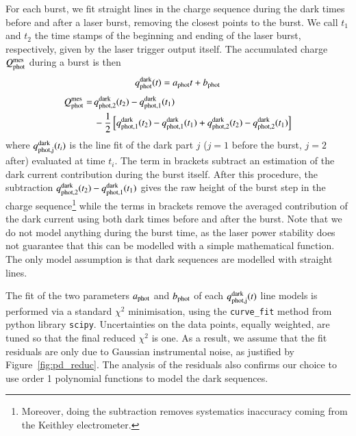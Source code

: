 For each burst, we fit straight lines in the charge sequence during the dark times before and after a laser burst, removing the closest points to the burst. We call $t_1$ and $t_2$ the time stamps of the beginning and ending of the laser burst, respectively, given by the laser trigger output itself. 
The accumulated charge $Q_{\mathrm{phot}}^{\mathrm{mes}}$ during a burst is then
\begin{equation}
q_{\rm phot}^{\rm dark}(t) = a_{\rm phot} t + b_{\rm phot}
\end{equation}
\begin{align}
Q_{\mathrm{phot}}^{\mathrm{mes}} = \, &q_{\rm phot,2}^{\rm dark}(t_2) - q_{\rm phot,1}^{\rm dark}(t_1)\\ & - \frac{1}{2} \left[ q_{\rm phot,1}^{\rm dark}(t_2) -  q_{\rm phot,1}^{\rm dark}(t_1) + q_{\rm phot,2}^{\rm dark}(t_2) - q_{\rm phot,2}^{\rm dark}(t_1)  \right]   \notag 
\end{align}
where $q_{\rm phot,j}^{\rm dark}(t_i)$ is the line fit of the dark part $j$ ($j=1$ before the burst, $j=2$ after) evaluated at time $t_i$. The term in brackets subtract an estimation of the dark current contribution during the burst itself. After this procedure, the subtraction $q_{\rm phot,2}^{\rm dark}(t_2) - q_{\rm phot,1}^{\rm dark}(t_1)$ gives the raw height of the burst step in the charge sequence\footnote{Moreover, doing the subtraction removes systematics inaccuracy coming from the Keithley electrometer.} while the terms in brackets remove the averaged contribution of the dark current using both dark times before and after the burst. Note that we do not model anything during the burst time, as the laser power stability does not guarantee that this can be modelled with a simple mathematical function. The only model assumption is that dark sequences are modelled with straight lines.

The fit of the two parameters $a_{\rm phot}$ and $b_{\rm phot}$ of each $q_{\rm phot,j}^{\rm dark}(t)$ line models is performed via a standard $\chi^2$ minimisation, using the \texttt{curve\_fit} method from python library \texttt{scipy}. Uncertainties on the data points, equally weighted, are tuned so that the final reduced $\chi^2$ is one. As a result, we assume that the fit residuals are only due to Gaussian instrumental noise, as justified by Figure~\ref{fig:pd_reduc}. The analysis of the residuals also confirms our choice to use order 1 polynomial functions to model the dark sequences.

